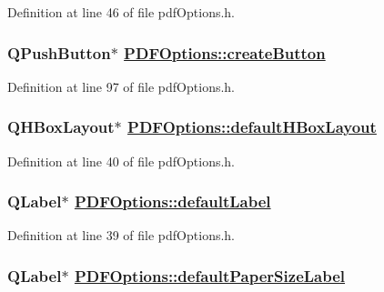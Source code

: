 Definition at line 46 of file pdf\-Options.h.\hypertarget{classPDFOptions_r54}{
\subsubsection[createButton]{\setlength{\rightskip}{0pt plus 5cm}QPush\-Button$\ast$ \hyperlink{classPDFOptions_r54}{PDFOptions::create\-Button}}}
\label{classPDFOptions_r54}


Definition at line 97 of file pdf\-Options.h.\hypertarget{classPDFOptions_r5}{
\subsubsection[defaultHBoxLayout]{\setlength{\rightskip}{0pt plus 5cm}QHBox\-Layout$\ast$ \hyperlink{classPDFOptions_r5}{PDFOptions::default\-HBox\-Layout}}}
\label{classPDFOptions_r5}


Definition at line 40 of file pdf\-Options.h.\hypertarget{classPDFOptions_r4}{
\subsubsection[defaultLabel]{\setlength{\rightskip}{0pt plus 5cm}QLabel$\ast$ \hyperlink{classPDFOptions_r4}{PDFOptions::default\-Label}}}
\label{classPDFOptions_r4}


Definition at line 39 of file pdf\-Options.h.\hypertarget{classPDFOptions_r7}{
\subsubsection[defaultPaperSizeLabel]{\setlength{\rightskip}{0pt plus 5cm}QLabel$\ast$ \hyperlink{classPDFOptions_r7}{PDFOptions::default\-Paper\-Size\-Label}}}
\label{classPDFOptions_r7}


